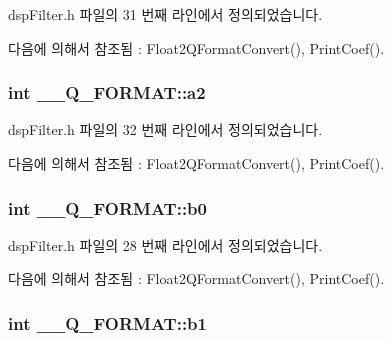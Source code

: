 dsp\+Filter.\+h 파일의 31 번째 라인에서 정의되었습니다.



다음에 의해서 참조됨 \+:  Float2\+Q\+Format\+Convert(), Print\+Coef().

\hypertarget{struct_____q___f_o_r_m_a_t_adf82b4d95ce195a01c00f0c2f4e043f5}{
\subsubsection[{a2}]{\setlength{\rightskip}{0pt plus 5cm}int \+\_\+\+\_\+\+Q\+\_\+\+F\+O\+R\+M\+A\+T\+::a2}}\label{struct_____q___f_o_r_m_a_t_adf82b4d95ce195a01c00f0c2f4e043f5}


dsp\+Filter.\+h 파일의 32 번째 라인에서 정의되었습니다.



다음에 의해서 참조됨 \+:  Float2\+Q\+Format\+Convert(), Print\+Coef().

\hypertarget{struct_____q___f_o_r_m_a_t_a0fc0b104bef03cc7de69bbb5e06cf942}{
\subsubsection[{b0}]{\setlength{\rightskip}{0pt plus 5cm}int \+\_\+\+\_\+\+Q\+\_\+\+F\+O\+R\+M\+A\+T\+::b0}}\label{struct_____q___f_o_r_m_a_t_a0fc0b104bef03cc7de69bbb5e06cf942}


dsp\+Filter.\+h 파일의 28 번째 라인에서 정의되었습니다.



다음에 의해서 참조됨 \+:  Float2\+Q\+Format\+Convert(), Print\+Coef().

\hypertarget{struct_____q___f_o_r_m_a_t_af204737e7c2b102b6c9a5272b9fe6856}{
\subsubsection[{b1}]{\setlength{\rightskip}{0pt plus 5cm}int \+\_\+\+\_\+\+Q\+\_\+\+F\+O\+R\+M\+A\+T\+::b1}}\label{struct_____q___f_o_r_m_a_t_af204737e7c2b102b6c9a5272b9fe6856}


